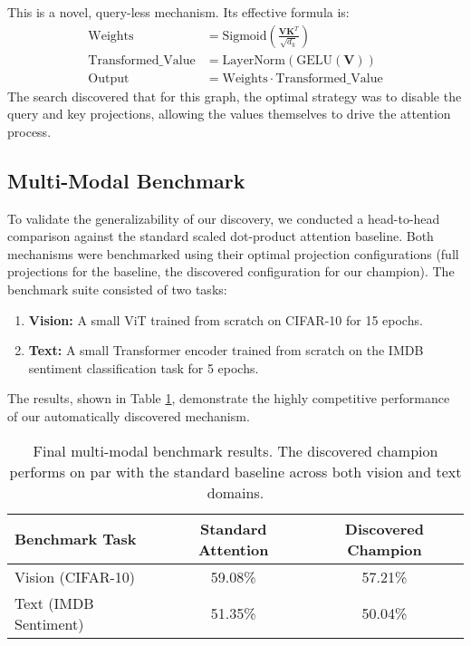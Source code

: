 \documentclass[11pt, a4paper]{article}
\begin{document}
This is a novel, query-less mechanism. Its effective formula is:
\begin{align}
\text{Weights} &= \text{Sigmoid}(\frac{\mathbf{V} \mathbf{K}^T}{\sqrt{d_k}}) \\
\text{Transformed\_Value} &= \text{LayerNorm}(\text{GELU}(\mathbf{V})) \\
\text{Output} &= \text{Weights} \cdot \text{Transformed\_Value}
\end{align}
The search discovered that for this graph, the optimal strategy was to disable the query and key projections, allowing the values themselves to drive the attention process.

\subsection{Multi-Modal Benchmark}
To validate the generalizability of our discovery, we conducted a head-to-head comparison against the standard scaled dot-product attention baseline. Both mechanisms were benchmarked using their optimal projection configurations (full projections for the baseline, the discovered configuration for our champion). The benchmark suite consisted of two tasks:
\begin{enumerate}
    \item \textbf{Vision:} A small ViT trained from scratch on CIFAR-10 for 15 epochs.
    \item \textbf{Text:} A small Transformer encoder trained from scratch on the IMDB sentiment classification task for 5 epochs.
\end{enumerate}

The results, shown in Table \ref{tab:results}, demonstrate the highly competitive performance of our automatically discovered mechanism.

\begin{table}[h!]
\centering
\caption{Final multi-modal benchmark results. The discovered champion performs on par with the standard baseline across both vision and text domains.}
\label{tab:results}
\begin{tabular}{@{}lcc@{}}
\toprule
\textbf{Benchmark Task}     & \textbf{Standard Attention} & \textbf{Discovered Champion} \\ \midrule
Vision (CIFAR-10)           & 59.08\%                     & 57.21\%                      \\
Text (IMDB Sentiment)       & 51.35\%                     & 50.04\%                      \\ \bottomrule
\end{tabular}
\end{table}
\end{document}
